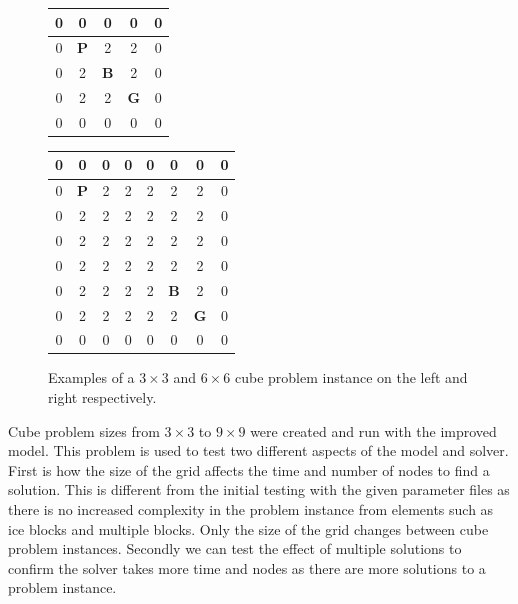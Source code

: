 \documentclass{article}
\begin{document}
\begin{figure}[H]
\centering
\begin{tabular}{ | c | c | c | c | c | }
\hline
0 & 0 & 0 & 0 & 0 \\ \hline
0 & \textbf{P} & 2 & 2 & 0 \\ \hline
0 & 2 & \textbf{B} & 2 & 0 \\ \hline
0 & 2 & 2 & \textbf{G} & 0 \\ \hline
0 & 0 & 0 & 0 & 0 \\ \hline
\end{tabular}
\hspace{1cm}
\begin{tabular}{ | c | c | c | c | c | c | c | c | }
\hline
0 & 0 & 0 & 0 & 0 & 0 & 0 & 0 \\ \hline
0 & \textbf{P} & 2 & 2 & 2 & 2 & 2 & 0 \\ \hline
0 & 2 & 2 & 2 & 2 & 2 & 2 & 0 \\ \hline
0 & 2 & 2 & 2 & 2 & 2 & 2 & 0 \\ \hline
0 & 2 & 2 & 2 & 2 & 2 & 2 & 0 \\ \hline
0 & 2 & 2 & 2 & 2 & \textbf{B} & 2 & 0 \\ \hline
0 & 2 & 2 & 2 & 2 & 2 & \textbf{G} & 0 \\ \hline
0 & 0 & 0 & 0 & 0 & 0 & 0 & 0 \\ \hline
\end{tabular}
\caption{Examples of a $3 \times 3$ and $6 \times 6$ cube problem instance on the left and right respectively.}
\end{figure}
\noindent
Cube problem sizes from $3 \times 3$ to $9 \times 9$ were created and run with the improved model. This problem is used to test two different aspects of the model and solver. First is how the size of the grid affects the time and number of nodes to find a solution. This is different from the initial testing with the given parameter files as there is no increased complexity in the problem instance from elements such as ice blocks and multiple blocks. Only the size of the grid changes between cube problem instances. Secondly we can test the effect of multiple solutions to confirm the solver takes more time and nodes as there are more solutions to a problem instance.
\end{document}
